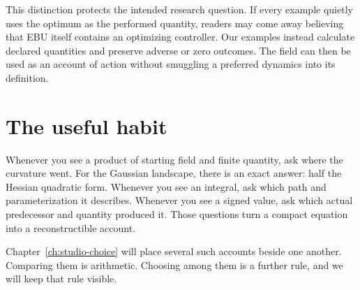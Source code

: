 This distinction protects the intended research question. If every example quietly uses the optimum as the performed quantity, readers may come away believing that EBU itself contains an optimizing controller. Our examples instead calculate declared quantities and preserve adverse or zero outcomes. The field can then be used as an account of action without smuggling a preferred dynamics into its definition.

\section{The useful habit}

Whenever you see a product of starting field and finite quantity, ask where the curvature went. For the Gaussian landscape, there is an exact answer: half the Hessian quadratic form. Whenever you see an integral, ask which path and parameterization it describes. Whenever you see a signed value, ask which actual predecessor and quantity produced it. Those questions turn a compact equation into a reconstructible account.

Chapter~\ref{ch:studio-choice} will place several such accounts beside one another. Comparing them is arithmetic. Choosing among them is a further rule, and we will keep that rule visible.
